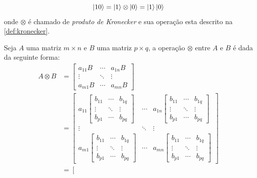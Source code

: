 $$
    \ket{10}=\ket{1}\otimes\ket{0}=\ket{1}\ket{0}
$$
onde $\otimes$ é chamado de \textit{produto de Kronecker} e sua operação esta descrito na \autoref{def:kronecker}.
\begin{defi}\label{def:kronecker}
    Seja $A$ uma matriz $m\times n$ e $B$ uma matriz $p\times q$, a operação $\otimes$ entre $A$ e $B$ é dada da seguinte forma:
    \begin{align*}
        A\otimes B & =\left[\begin{array}{ccc}
            a_{11}B & \cdots & a_{1n}B \\
            \vdots & \ddots & \vdots \\
            a_{m1}B & \cdots & a_{mn}B
        \end{array}\right] \\&
        = \left[\begin{array}{ccc}
            a_{11}\left[\begin{array}{ccc}
            b_{11} & \cdots & b_{1q} \\
            \vdots & \ddots & \vdots \\
            b_{p1} & \cdots & b_{pq}
        \end{array}\right]   & \cdots & a_{1n}\left[\begin{array}{ccc}
            b_{11} & \cdots & b_{1q} \\
            \vdots & \ddots & \vdots \\
            b_{p1} & \cdots & b_{pq}
        \end{array}\right]  \\
            \vdots & \ddots & \vdots \\
            a_{m1}\left[\begin{array}{ccc}
            b_{11} & \cdots & b_{1q} \\
            \vdots & \ddots & \vdots \\
            b_{p1} & \cdots & b_{pq}
        \end{array}\right]  & \cdots & a_{mn}\left[\begin{array}{ccc}
            b_{11} & \cdots & b_{1q} \\
            \vdots & \ddots & \vdots \\
            b_{p1} & \cdots & b_{pq}
        \end{array}\right] 
        \end{array}\right] \\&
        = \left[\begin{array}{ccccccc}

\end{array}
\end{align*}
\end{defi}
